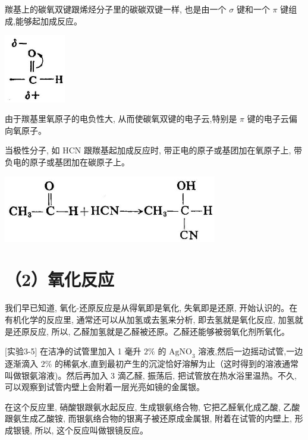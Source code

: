 \documentclass[10pt]{article}
\begin{document}
羰基上的碳氧双键跟烯烃分子里的碳碳双键一样, 也是由一个 \(\sigma\) 键和一个 \(\pi\) 键组成,能够起加成反应。

\begin{center}
\includegraphics[max width=0.2\textwidth]{images/01912d16-be99-77bb-9535-4f3ed8d9946f_127_863311.jpg}
\end{center}

由于羰基里氧原子的电负性大, 从而使碳氧双键的电子云,特别是 \(\pi\) 键的电子云偏向氧原子。

当极性分子, 如 HCN 跟羰基起加成反应时, 带正电的原子或基团加在氧原子上, 带负电的原子或基团加在碳原子上。

\begin{center}
\includegraphics[max width=0.7\textwidth]{images/01912d16-be99-77bb-9535-4f3ed8d9946f_127_549967.jpg}
\end{center}

\section*{（2）氧化反应}

我们早已知道, 氧化-还原反应是从得氧即是氧化, 失氧即是还原, 开始认识的。在有机化学的反应里, 通常还可以从加氢或去氢来分析, 即去氢就是氧化反应, 加氢就是还原反应, 所以, 乙醛加氢就是乙醛被还原。乙醛还能够被弱氧化剂所氧化。

[实验3-5] 在洁净的试管里加入 1 毫升 \(2\%\) 的 \({\mathrm{{AgNO}}}_{3}\) 溶液,然后一边摇动试管,一边逐渐滴入 \(2\%\) 的稀氨水,直到最初产生的沉淀恰好溶解为止（这时得到的溶液通常叫做银氨溶液)。然后再加入 3 滴乙醛, 振荡后, 把试管放在热水浴里温热。不久, 可以观察到试管内壁上会附着一层光亮如镜的金属银。

在这个反应里, 硝酸银跟氨水起反应, 生成银氨络合物, 它把乙醛氧化成乙酸, 乙酸跟氨生成乙酸铵, 而银氨络合物的银离子被还原成金属银, 附着在试管的内壁上, 形成银镜, 所以, 这个反应叫做银镜反应。
\end{document}
